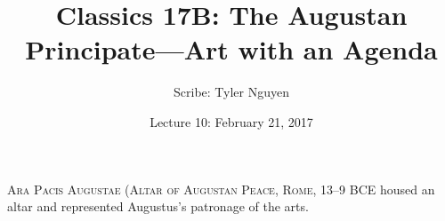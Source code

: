 \documentclass{article}
\begin{document}
\title{Classics 17B: The Augustan Principate---Art with an Agenda}
\author{Scribe: Tyler Nguyen}
\date{Lecture 10: February 21, 2017}
\maketitle
\textsc{Ara Pacis Augustae (Altar of Augustan Peace, Rome, 13--9 BCE} housed an altar and represented Augustus's patronage of the arts.
\end{document}
